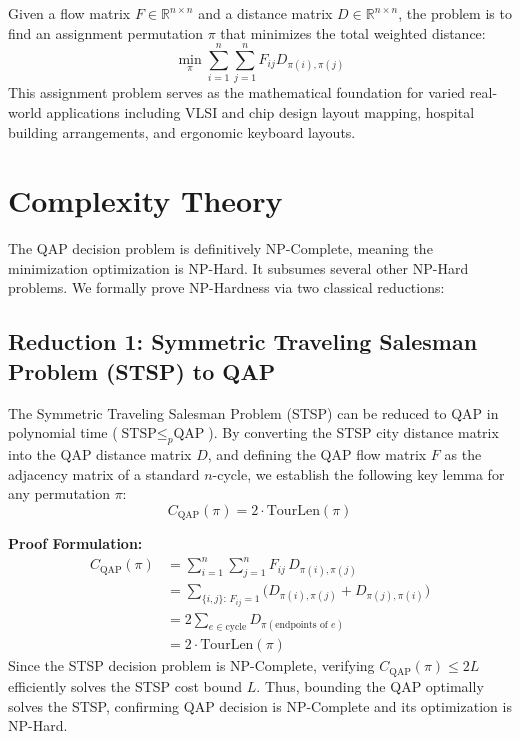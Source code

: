 \documentclass[sigconf,nonacm]{acmart}
\begin{document}
Given a flow matrix $F \in \mathbb{R}^{n \times n}$ and a distance matrix $D \in \mathbb{R}^{n \times n}$, the problem is to find an assignment permutation $\pi$ that minimizes the total weighted distance:
\begin{equation}
    \min_{\pi} \sum_{i=1}^n \sum_{j=1}^n F_{ij} D_{\pi(i),\pi(j)}
\end{equation}
This assignment problem serves as the mathematical foundation for varied real-world applications including VLSI and chip design layout mapping, hospital building arrangements, and ergonomic keyboard layouts.

\section{Complexity Theory}
The QAP decision problem is definitively NP-Complete, meaning the minimization optimization is NP-Hard. It subsumes several other NP-Hard problems. We formally prove NP-Hardness via two classical reductions:

\subsection{Reduction 1: Symmetric Traveling Salesman Problem (STSP) to QAP}
The Symmetric Traveling Salesman Problem (STSP) can be reduced to QAP in polynomial time ($\text{STSP} \le_p \text{QAP}$). By converting the STSP city distance matrix into the QAP distance matrix $D$, and defining the QAP flow matrix $F$ as the adjacency matrix of a standard $n$-cycle, we establish the following key lemma for any permutation $\pi$:
\begin{equation}
    C_{\text{QAP}}(\pi) = 2\cdot\mathrm{TourLen}(\pi)
\end{equation}

\textbf{Proof Formulation:}
\begin{align}
  C_{\text{QAP}}(\pi) &= \sum_{i=1}^n\sum_{j=1}^n F_{ij}\,D_{\pi(i),\pi(j)} \nonumber \\
  &= \sum_{\{i,j\}:\,F_{ij}=1} \bigl(D_{\pi(i),\pi(j)}+D_{\pi(j),\pi(i)}\bigr) \nonumber \\
  &= 2\sum_{e\in\text{cycle}} D_{\pi(\text{endpoints of }e)} \nonumber \\
  &= 2\cdot\mathrm{TourLen}(\pi)
\end{align}
Since the STSP decision problem is NP-Complete, verifying $C_{\text{QAP}}(\pi) \le 2L$ efficiently solves the STSP cost bound $L$. Thus, bounding the QAP optimally solves the STSP, confirming QAP decision is NP-Complete and its optimization is NP-Hard.
\end{document}
